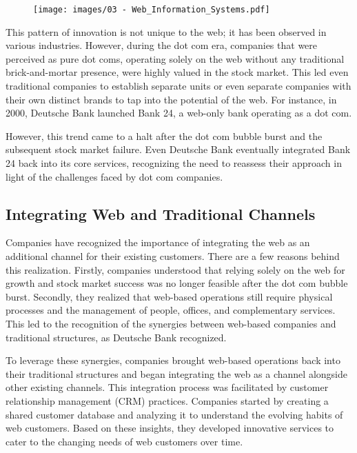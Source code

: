 \begin{figure}[!h]
  \centering
  \texttt{[image: images/03 - Web\_Information\_Systems.pdf]}
\end{figure}

This pattern of innovation is not unique to the web; it has been
observed in various industries. However, during the dot com era,
companies that were perceived as pure dot coms, operating solely on the
web without any traditional brick-and-mortar presence, were highly
valued in the stock market. This led even traditional companies to
establish separate units or even separate companies with their own
distinct brands to tap into the potential of the web. For instance, in
2000, Deutsche Bank launched Bank 24, a web-only bank operating as a dot
com.

However, this trend came to a halt after the dot com bubble burst and
the subsequent stock market failure. Even Deutsche Bank eventually
integrated Bank 24 back into its core services, recognizing the need to
reassess their approach in light of the challenges faced by dot com
companies.

\subsection{Integrating Web and Traditional
  Channels}\label{integrating-web-and-traditional-channels}

Companies have recognized the importance of integrating the web as an
additional channel for their existing customers. There are a few reasons
behind this realization. Firstly, companies understood that relying
solely on the web for growth and stock market success was no longer
feasible after the dot com bubble burst. Secondly, they realized that
web-based operations still require physical processes and the management
of people, offices, and complementary services. This led to the
recognition of the synergies between web-based companies and traditional
structures, as Deutsche Bank recognized.

To leverage these synergies, companies brought web-based operations back
into their traditional structures and began integrating the web as a
channel alongside other existing channels. This integration process was
facilitated by customer relationship management (CRM) practices.
Companies started by creating a shared customer database and analyzing
it to understand the evolving habits of web customers. Based on these
insights, they developed innovative services to cater to the changing
needs of web customers over time.

